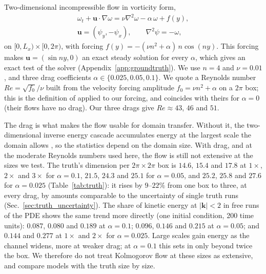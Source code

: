 Two-dimensional incompressible flow in vorticity form,
\begin{equation}
\begin{gathered}
  \omega_t + \bm u\cdot\nabla\omega = \nu\nabla^2\omega - \alpha\,\omega + f(y),\\
  \bm u = (\psi_y,-\psi_x),\qquad \nabla^2\psi=-\omega,
\end{gathered}
  \label{eq:kolmogorov}
\end{equation}
on $[0,L_x)\times[0,2\pi)$, with forcing
$f(y) = -(\nu n^2+\alpha)\,n\cos(ny)$. This forcing makes
$\bm u = (\sin ny, 0)$ an exact steady solution for every $\alpha$, which
gives an exact test of the solver (Appendix~\ref{app:groundtruth}).
We use $n=4$ and $\nu=0.01$, and three drag coefficients
$\alpha\in\{0.025,0.05,0.1\}$. We quote a Reynolds number
$Re=\sqrt{f_0}/\nu$ built from the velocity forcing amplitude
$f_0=\nu n^2+\alpha$ on a $2\pi$ box; this is the definition of
\citet{kolmogorovregimes2026} applied to our forcing, and coincides with
theirs for $\alpha=0$ (their flows have no drag). Our three drags give
$Re\approx43$, $46$ and $51$.

The drag is what makes the flow usable for domain transfer. Without it,
the two-dimensional inverse energy cascade accumulates energy at the
largest scale the domain allows
\citep{kraichnan1967,smithyakhot1993,boffettaecke2012}, so the
statistics depend on the domain size. With drag, and at the moderate
Reynolds numbers used here, the flow is still not extensive at the sizes
we test. The truth's dimension per $2\pi\times2\pi$ box is $14.6$, $15.4$
and $17.8$ at $1\times$, $2\times$ and $3\times$ for $\alpha=0.1$, $21.5$,
$24.3$ and $25.1$ for $\alpha=0.05$, and $25.2$, $25.8$ and $27.6$ for
$\alpha=0.025$ (Table~\ref{tab:truth}): it rises by $9$--$22\%$ from one
box to three, at every drag, by amounts comparable to the uncertainty of
single truth runs (Sec.~\ref{sec:truth_uncertainty}). The share of kinetic
energy at $|\bm k|<2$ in free runs of the PDE shows the same trend more
directly (one initial condition, 200 time units): $0.087$, $0.080$ and
$0.189$ at $\alpha=0.1$; $0.096$, $0.146$ and $0.215$ at $\alpha=0.05$; and
$0.144$ and $0.277$ at $1\times$ and $2\times$ for $\alpha=0.025$. Large scales
gain energy as the channel widens, more at weaker drag; at $\alpha=0.1$
this sets in only beyond twice the box. We therefore do not treat
Kolmogorov flow at these sizes as extensive, and compare models with the
truth size by size.


